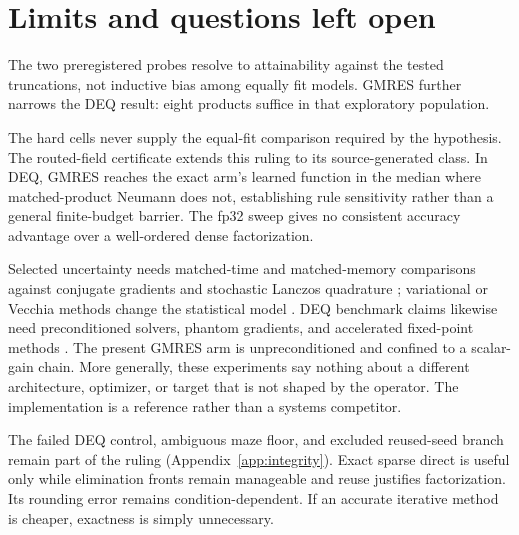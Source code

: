 \section{Limits and questions left open}
\label{sec:program}

The two preregistered probes resolve to attainability against the tested
truncations, not inductive bias among equally fit models. GMRES further narrows
the DEQ result: eight products suffice in that exploratory population.

The hard cells never supply the equal-fit comparison required by the
hypothesis. The routed-field certificate extends this ruling to its
source-generated class. In DEQ, GMRES reaches the exact arm's learned function
in the median where matched-product Neumann does not, establishing rule
sensitivity rather than a general finite-budget barrier. The fp32 sweep gives
no consistent accuracy advantage over a well-ordered dense factorization.

Selected uncertainty needs matched-time and
matched-memory comparisons against
conjugate gradients and stochastic Lanczos quadrature
\citep{gardner2018gpytorch,ubaru2017fast}; variational or Vecchia methods change
the statistical model \citep{hensman2013gaussian,katzfuss2021general}. DEQ
benchmark claims likewise need preconditioned solvers, phantom gradients, and
accelerated fixed-point methods
\citep{geng2021training,anderson1965iterative,broyden1965class}. The present
GMRES arm is unpreconditioned and confined to a scalar-gain chain. More
generally, these experiments say nothing about a different architecture,
optimizer, or target that is not shaped by the operator. The implementation is
a reference rather than a systems competitor.

The failed DEQ control, ambiguous maze floor, and excluded reused-seed branch
remain part of the ruling (Appendix~\ref{app:integrity}). Exact sparse direct is
useful only while elimination fronts remain manageable and reuse justifies
factorization. Its rounding error remains condition-dependent. If an accurate
iterative method is cheaper, exactness is simply unnecessary.
